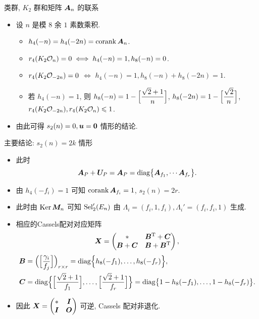 \documentclass[aspectratio=169]{ctexbeamer}
\renewcommand\aleg[2]{\Bigl[\dfrac{{#1}}{#2}\Bigr]}
\begin{document}
\begin{frame}{类群, $K_2$ 群和矩阵 ${\boldsymbol{A}}_n$ 的联系}
	\begin{itemize}
		\item 设 $n$ 是模 $8$ 余 $1$ 素数乘积.
		\begin{itemize}
			\item $h_4(-n)=h_4(-2n)=\operatorname{corank}{\boldsymbol{A}}_n$.
			\item $r_4(K_2{\mathcal{O}}_n)=0\iff h_4(-n)=1,h_8(-n)=0$.
			\item $r_4(K_2{\mathcal{O}}_{-2n})=0$ $\iff$ $h_4(-n)=1,h_8(-n)+h_8(-2n)=1$.
			\item 若 $h_4(-n)=1$, 则 $h_8(-n)=1-\aleg{\sqrt2+1}{n}$,  $h_8(-2n)=1-\aleg{\sqrt2}{n}$, $r_4(K_2{\mathcal{O}}_{-2n}),r_4(K_2{\mathcal{O}}_n)\leqslant 1$.
		\end{itemize}
		\item 由此可得 $s_2(n)=0,{\boldsymbol{u}}={\bf0}$ 情形的结论.
	\end{itemize}
\end{frame}


\begin{frame}{主要结论: $s_2(n)=2k$ 情形}
	\begin{itemize}
		\item 此时
		\[
			{\boldsymbol{A}}_P+{\boldsymbol{U}}_P={\boldsymbol{A}}_P={\mathrm{diag}}\bigl\{
				{\boldsymbol{A}}_{f_1},\cdots {\boldsymbol{A}}_{f_r}
			\bigr\}.
		\]
		\item 由 $h_4(-f_i)=1$ 可知 $\operatorname{corank} {\boldsymbol{A}}_{f_i}=1$, $s_2(n)=2r$.
		\item 此时由 $\operatorname{Ker}{\boldsymbol{M}}_n$ 可知 ${\mathrm{Sel}}_2'(E_n)$ 由 $\Lambda_i=(f_i,1,f_i),\Lambda_i'=(f_i,f_i,1)$ 生成.
		\item 相应的Cassels配对对应矩阵
		\[
			{\boldsymbol{X}}=\begin{pmatrix}
				*&{\boldsymbol{B}}^{\mathrm{T}}+{\boldsymbol{C}}\\{\boldsymbol{B}}+{\boldsymbol{C}}&{\boldsymbol{B}}+{\boldsymbol{B}}^{\mathrm{T}}
			\end{pmatrix},
		\]
		\begin{align*}
			\bfB&
			=\Bigl(\aleg{\gamma_i}{f_j}\Bigr)_{r\times r}
			=\diag\Bigl\{h_8(-f_1),\dots,h_8(-f_r)\Bigr\},\\
			\bfC&
			=\diag\Bigl\{\aleg{\sqrt2+1}{f_1},\dots,\aleg{\sqrt2+1}{f_r}\Bigr\}
			=\diag\bigl\{1-h_8(-f_1),\dots,1-h_8(-f_r)\bigr\}.
		\end{align*}
		\item 因此 ${\boldsymbol{X}}=\begin{pmatrix}
			*&{\boldsymbol{I}}\\{\boldsymbol{I}}&{\boldsymbol{O}}
		\end{pmatrix}$ 可逆, Cassels 配对非退化.
	\end{itemize}
\end{frame}
\end{document}
